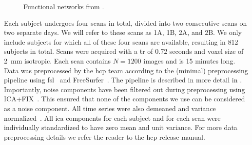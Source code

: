 \begin{figure}[t]
  \hspace{0.08\textwidth}
  \hspace{0.08\textwidth}
  \caption{
    Functional networks from \textcite{Smith2009}.
  }
  \label{fig:brainmap-functional-networks}
\end{figure}

\captionsetup[subfigure]{labelformat=simple, labelsep=colon}  %


Each subject undergoes four scans in total, divided into two consecutive scans on two separate days.
We will refer to these scans as 1A, 1B, 2A, and 2B.
We only include subjects for which all of these four scans are available, resulting in 812 subjects in total.
Scans were acquired with a \gls{tr} of 0.72 seconds and voxel size of 2~mm isotropic.
Each scan contains $N = 1200$ images and is 15 minutes long.
%
Data was preprocessed by the \gls{hcp} team according to the (minimal) preprocessing pipeline using \gls{fsl}~\parencite{Jenkinson2012} and FreeSurfer~\parencite{Fischl2012}.
The pipeline is described in more detail in \textcite{Jenkinson2002, Glasser2013, Smith2013a, Smith2013b}.
Importantly, noise components have been filtered out during preprocessing using ICA+FIX~\parencite{Salimi2014, Griffanti2014}.
This ensured that none of the components we use can be considered as a noise component.
All time series were also demeaned and variance normalized~\parencite{Beckmann2004}.
All \gls{ica} components for each subject and for each scan were individually standardized to have zero mean and unit variance.
For more data preprocessing details we refer the reader to the \gls{hcp} release manual.

